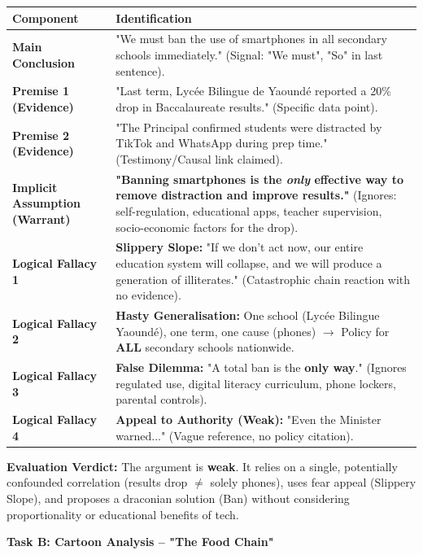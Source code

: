 \documentclass[11pt]{article}
\begin{document}
\begin{exoresolu}
\begin{center}
\begin{tabularx}{\linewidth}{|l|X|}
\hline
\rowcolor{popblueL} \textbf{Component} & \textbf{Identification} \\
\hline
\textbf{Main Conclusion} & "We must ban the use of smartphones in all secondary schools immediately." (Signal: "We must", "So" in last sentence). \\
\hline
\textbf{Premise 1 (Evidence)} & "Last term, Lycée Bilingue de Yaoundé reported a 20\% drop in Baccalaureate results." (Specific data point). \\
\hline
\textbf{Premise 2 (Evidence)} & "The Principal confirmed students were distracted by TikTok and WhatsApp during prep time." (Testimony/Causal link claimed). \\
\hline
\textbf{Implicit Assumption (Warrant)} & \textbf{"Banning smartphones is the \emph{only} effective way to remove distraction and improve results."} (Ignores: self-regulation, educational apps, teacher supervision, socio-economic factors for the drop). \\
\hline
\textbf{Logical Fallacy 1} & \textbf{Slippery Slope:} "If we don't act now, our entire education system will collapse, and we will produce a generation of illiterates." (Catastrophic chain reaction with no evidence). \\
\hline
\textbf{Logical Fallacy 2} & \textbf{Hasty Generalisation:} One school (Lycée Bilingue Yaoundé), one term, one cause (phones) $\rightarrow$ Policy for \textbf{ALL} secondary schools nationwide. \\
\hline
\textbf{Logical Fallacy 3} & \textbf{False Dilemma:} "A total ban is the \textbf{only way}." (Ignores regulated use, digital literacy curriculum, phone lockers, parental controls). \\
\hline
\textbf{Logical Fallacy 4} & \textbf{Appeal to Authority (Weak):} "Even the Minister warned..." (Vague reference, no policy citation). \\
\hline
\end{tabularx}
\end{center}

\textbf{Evaluation Verdict:} The argument is \textbf{weak}. It relies on a single, potentially confounded correlation (results drop $\neq$ solely phones), uses fear appeal (Slippery Slope), and proposes a draconian solution (Ban) without considering proportionality or educational benefits of tech.

\textbf{Task B: Cartoon Analysis -- "The Food Chain"}


\end{exoresolu}
\end{document}
